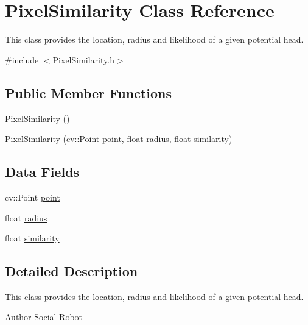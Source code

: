 \hypertarget{classPixelSimilarity}{\section{Pixel\-Similarity Class Reference}
\label{classPixelSimilarity}
}


This class provides the location, radius and likelihood of a given potential head.  




{\ttfamily \#include $<$Pixel\-Similarity.\-h$>$}

\subsection*{Public Member Functions}
\begin{DoxyCompactItemize}
\item 
\hyperlink{classPixelSimilarity_a8d2c663a253dafb804765764e2dea32a}{Pixel\-Similarity} ()
\item 
\hyperlink{classPixelSimilarity_a0816faaaedb8d0e1ffe0aa40a438df4e}{Pixel\-Similarity} (cv\-::\-Point \hyperlink{classPixelSimilarity_a98e029104a5ee11b23554b02d7ac30e6}{point}, float \hyperlink{classPixelSimilarity_a4da3847fd0812a4c4fc415a20697acf4}{radius}, float \hyperlink{classPixelSimilarity_a4fa484885e6d7d38078c6d75e4f4d72e}{similarity})
\end{DoxyCompactItemize}
\subsection*{Data Fields}
\begin{DoxyCompactItemize}
\item 
cv\-::\-Point \hyperlink{classPixelSimilarity_a98e029104a5ee11b23554b02d7ac30e6}{point}
\item 
float \hyperlink{classPixelSimilarity_a4da3847fd0812a4c4fc415a20697acf4}{radius}
\item 
float \hyperlink{classPixelSimilarity_a4fa484885e6d7d38078c6d75e4f4d72e}{similarity}
\end{DoxyCompactItemize}


\subsection{Detailed Description}
This class provides the location, radius and likelihood of a given potential head. 

\begin{DoxyAuthor}{Author}
Social Robot 
\end{DoxyAuthor}


